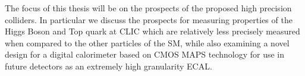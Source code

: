 The focus of this thesis will be on the prospects of the proposed high precision colliders. In particular we discuss the prospects for measuring properties of the Higgs Boson and Top quark at \ac{CLIC} which are relatively less precisely measured when compared to the other particles of the \ac{SM}, while also examining a novel design for a digital calorimeter based on \ac{CMOS} \ac{MAPS} technology for use in future detectors as an extremely high granularity \ac{ECAL}.  


 
